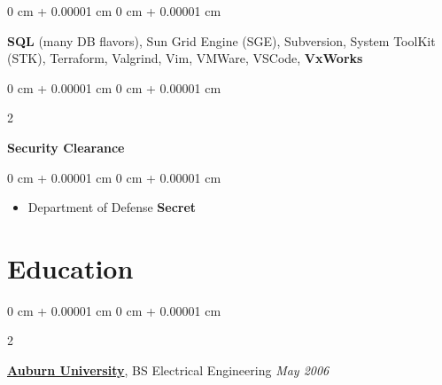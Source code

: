 \documentclass[10pt, letterpaper]{article}
\newenvironment{highlights}{
    \begin{itemize}[
        topsep=0.10 cm,
        parsep=0.10 cm,
        partopsep=0pt,
        itemsep=0pt,
        leftmargin=0 cm + 10pt
    ]
}{
    \end{itemize}
} %
\newenvironment{highlightsforbulletentries}{
    \begin{itemize}[
        topsep=0.10 cm,
        parsep=0.10 cm,
        partopsep=0pt,
        itemsep=0pt,
        leftmargin=10pt
    ]
}{
    \end{itemize}
} %
\newenvironment{onecolentry}{
    \begin{adjustwidth}{
        0 cm + 0.00001 cm
    }{
        0 cm + 0.00001 cm
    }
}{
    \end{adjustwidth}
} %
\newenvironment{twocolentry}[2][]{
    \onecolentry
    \def\secondColumn{#2}
    \setcolumnwidth{\fill, 4.5 cm}
    \begin{paracol}{2}
}{
    \switchcolumn \raggedleft \secondColumn
    \end{paracol}
    \endonecolentry
} %
\begin{document}
\begin{onecolentry}
\begin{highlightsforbulletentries}
                                        \textbf{SQL} (many DB flavors),
                                        Sun Grid Engine (SGE), 
                                        Subversion, 
                                        System ToolKit (STK), 
                                        Terraform, 
                                        Valgrind, 
                                        Vim, 
                                        VMWare, 
                                        VSCode, 
                                        \textbf{VxWorks}
        \end{highlightsforbulletentries}
    \end{onecolentry}

    \vspace{0.20 cm}

    \begin{twocolentry}{
        }
            \textbf{\large Security Clearance}
    \end{twocolentry}
    \begin{onecolentry}
        \begin{highlightsforbulletentries}
            \item Department of Defense \textbf{Secret}
        \end{highlightsforbulletentries}
    \end{onecolentry}

    \vspace{0.30 cm}

    \section{Education}



        
        \begin{twocolentry}{
            \textit{\small May 2006}
        }
            \href{http://www.auburn.edu/}{\textbf{Auburn University}}, BS Electrical Engineering\end{twocolentry}

        \vspace{0.20 cm}
\end{document}
